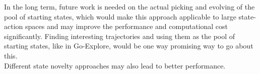 \documentclass{article}
\begin{document}
In the long term, future work is needed on the actual picking and evolving of the pool of starting states, which would make this approach applicable to large state-action spaces and may improve the performance and computational cost significantly. Finding interesting trajectories and using them as the pool of starting states, like in Go-Explore, would be one way promising way to go about this. \\
Different state novelty approaches may also lead to better performance.


\newpage


\end{document}
